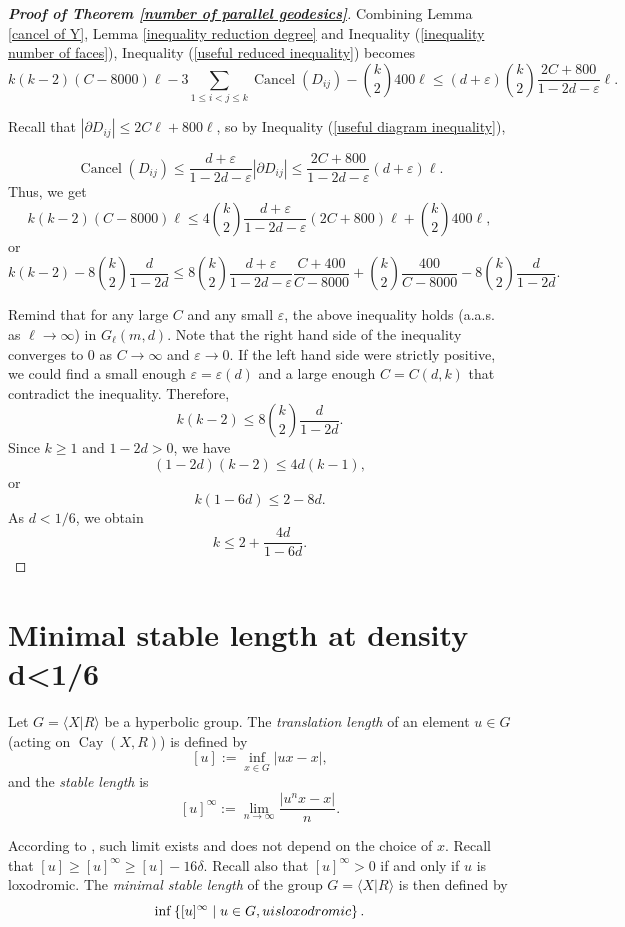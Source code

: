 \documentclass[a4paper]{article}
\DeclareMathOperator{\Cay}{Cay}
\DeclareMathOperator{\Cancel}{Cancel}
\newcommand\SetCond[2]{\left\{ #1 \;\middle|\; #2 \right\}}
\newcommand\Pres[2]{\langle #1 | #2 \rangle}
\theoremstyle{remark}
\begin{document}
\begin{proof}[\textbf{Proof of Theorem \ref{number of parallel geodesics}}]\quad

Combining Lemma \ref{cancel of Y}, Lemma \ref{inequality reduction degree} and Inequality (\ref{inequality number of faces}), Inequality (\ref{useful reduced inequality}) becomes
\[k(k-2)(C-8000)\ell - 3\sum_{1\leq i<j\leq k}\Cancel(D_{ij}) - \binom{k}{2}400\ell \leq (d+\varepsilon)\binom{k}{2}\frac{2C+800}{1-2d-\varepsilon}\ell.\]

Recall that $|\partial D_{ij}| \leq 2C\ell+800\ell$, so by Inequality (\ref{useful diagram inequality}),

\[\Cancel(D_{ij}) \leq \frac{d+\varepsilon}{1-2d-\varepsilon}|\partial D_{ij}| \leq \frac{2C+800}{1-2d-\varepsilon}(d+\varepsilon)\ell.\]
Thus, we get
\[k(k-2)(C-8000)\ell \leq 4\binom{k}{2}\frac{d+\varepsilon}{1-2d-\varepsilon}(2C+800)\ell+ \binom{k}{2}400\ell,\]
or
\[k(k-2) - 8\binom{k}{2}\frac{d}{1-2d} \leq 8\binom{k}{2}\frac{d+\varepsilon}{1-2d-\varepsilon} \frac{C+400}{C-8000} + \binom{k}{2}\frac{400}{C-8000} - 8\binom{k}{2}\frac{d}{1-2d}.\]

Remind that for any large $C$ and any small $\varepsilon$, the above inequality holds (a.a.s. as $\ell\to\infty$) in $G_\ell(m,d)$. Note that the right hand side of the inequality converges to $0$ as $C\to\infty$ and $\varepsilon\to 0$. If the left hand side were strictly positive, we could find a small enough $\varepsilon=\varepsilon(d)$ and a large enough $C = C(d,k)$ that contradict the inequality. Therefore,
\[k(k-2) \leq 8\binom{k}{2}\frac{d}{1-2d}.\]
Since $k\geq 1$ and $1-2d>0$, we have
\[(1-2d)(k-2)\leq 4d(k-1),\]
or
\[k(1-6d)\leq 2-8d.\]
As $d<1/6$, we obtain
\[k \leq 2 + \frac{4d}{1-6d}.\]

\end{proof}


\section{Minimal stable length at density d<1/6}

Let $G = \Pres{X}{R}$ be a hyperbolic group. The \textit{translation length} of an element $u\in G$ (acting on $\Cay(X,R)$) is defined by \[[u]:=\inf_{x\in G}|ux-x|,\]
and the \textit{stable length} is \[ [u]^\infty:=\lim_{n\to\infty}\frac{|u^nx-x|}{n}.\]

According to \cite[Ch.10 \S 6]{CDP90}, such limit exists and does not depend on the choice of $x$. Recall that $[u]\geq [u]^\infty\geq [u]-16\delta$. Recall also that $[u]^\infty>0$ if and only if $u$ is loxodromic. The \textit{minimal stable length} of the group $G = \Pres{X}{R}$ is then defined by \[\inf\SetCond{[u]^\infty}{u\in G, u \textup{ is loxodromic}}.\]
\end{document}
